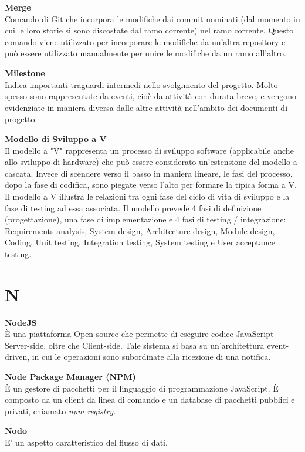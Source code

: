 \documentclass[a4paper, oneside, openany, dvipsnames, table, 12pt]{article}
\begin{document}
\textbf{Merge} \\
Comando di Git che incorpora le modifiche dai commit nominati (dal momento in cui le loro storie si sono discostate dal ramo corrente) nel ramo corrente. Questo comando viene utilizzato per incorporare le modifiche
da un'altra repository e può essere utilizzato manualmente per unire le modifiche da un ramo all’altro.

\textbf{Milestone} \\
Indica importanti traguardi intermedi nello svolgimento del progetto. Molto spesso sono rappresentate da eventi, cioè da attività con durata breve, e vengono evidenziate in maniera diversa dalle altre attività nell'ambito dei documenti di progetto.

\textbf{Modello di Sviluppo a V} \\
Il modello a "V" rappresenta un processo di sviluppo software (applicabile anche allo sviluppo di hardware) che può essere considerato un'estensione del modello a cascata. Invece di scendere verso il basso in maniera lineare, le fasi del processo, dopo la fase di codifica, sono piegate verso l'alto per formare la tipica forma a V. Il modello a V illustra le relazioni tra ogni fase del ciclo di vita di sviluppo e la fase di testing ad essa associata. Il modello prevede 4 fasi di definizione (progettazione), una fase di implementazione e 4 fasi di testing / integrazione: Requirements analysis, System design, Architecture design, Module design, Coding, Unit testing, Integration testing, System testing e User acceptance testing.

\newpage
\section{N}
\textbf{NodeJS}\\	
\`E una piattaforma Open source che permette di eseguire codice JavaScript Server-side, oltre che Client-side. Tale sistema si basa su un'architettura event-driven, in cui le operazioni sono subordinate alla ricezione di una notifica.

\textbf{Node Package Manager (NPM)} \\
È un gestore di pacchetti per il linguaggio di programmazione JavaScript.
È composto da un client da linea di comando e un database di pacchetti pubblici e privati, chiamato \textit{npm registry}. 

\textbf{Nodo} \\
E' un aspetto caratteristico del flusso di dati.
\end{document}
